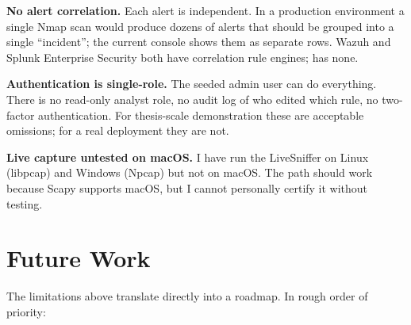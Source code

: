 \textbf{No alert correlation.} Each alert is independent. In a
production environment a single Nmap scan would produce dozens
of alerts that should be grouped into a single ``incident'';
the current console shows them as separate rows. Wazuh and
Splunk Enterprise Security both have correlation rule engines;
\nidsname{} has none.

\textbf{Authentication is single-role.} The seeded admin user
can do everything. There is no read-only analyst role, no
audit log of who edited which rule, no two-factor
authentication. For thesis-scale demonstration these are
acceptable omissions; for a real deployment they are not.

\textbf{Live capture untested on macOS.} I have run the
LiveSniffer on Linux (libpcap) and Windows (Npcap) but not on
macOS. The path should work because Scapy supports macOS, but
I cannot personally certify it without testing.

\section{Future Work}
\label{sec:conc-future}

The limitations above translate directly into a roadmap. In rough
order of priority:


